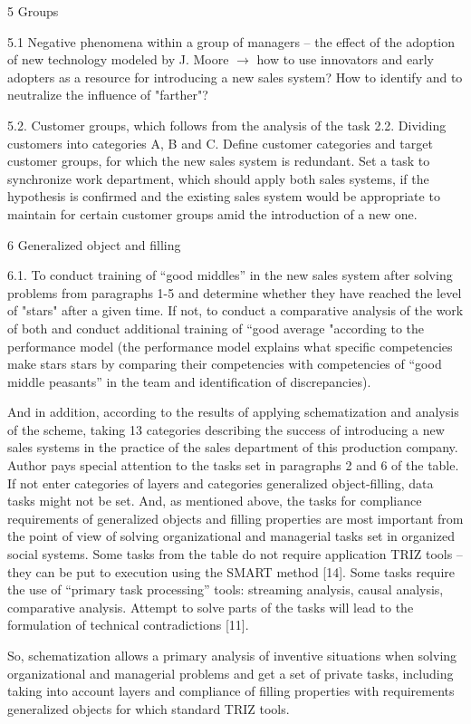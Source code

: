 5 Groups

5.1 Negative phenomena within a group of managers -- the effect of the
adoption of new technology modeled by J. Moore $\to$ how to use innovators and
early adopters as a resource for introducing a new sales system? How to
identify and to neutralize the influence of "farther"?

5.2.  Customer groups, which follows from the analysis of the task 2.2.
Dividing customers into categories A, B and C. Define customer categories and
target customer groups, for which the new sales system is redundant. Set a
task to synchronize work department, which should apply both sales systems, if
the hypothesis is confirmed and the existing sales system would be appropriate
to maintain for certain customer groups amid the introduction of a new one.

6 Generalized object and filling

6.1.  To conduct training of “good middles” in the new sales system after
solving problems from paragraphs 1-5 and determine whether they have reached
the level of "stars" after a given time. If not, to conduct a comparative
analysis of the work of both and conduct additional training of “good average
"according to the performance model (the performance model explains what
specific competencies make stars stars by comparing their competencies with
competencies of “good middle peasants” in the team and identification of
discrepancies).

And in addition, according to the results of applying schematization and
analysis of the scheme, taking 13 categories describing the success of
introducing a new sales systems in the practice of the sales department of
this production company. Author pays special attention to the tasks set in
paragraphs 2 and 6 of the table. If not enter categories of layers and
categories generalized object-filling, data tasks might not be set. And, as
mentioned above, the tasks for compliance requirements of generalized objects
and filling properties are most important from the point of view of solving
organizational and managerial tasks set in organized social systems. Some
tasks from the table do not require application TRIZ tools -- they can be put
to execution using the SMART method [14].  Some tasks require the use of
“primary task processing” tools: streaming analysis, causal analysis,
comparative analysis. Attempt to solve parts of the tasks will lead to the
formulation of technical contradictions [11].

So, schematization allows a primary analysis of inventive situations when
solving organizational and managerial problems and get a set of private tasks,
including taking into account layers and compliance of filling properties with
requirements generalized objects for which standard TRIZ tools.

